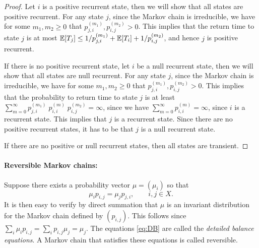 \begin{proof}
Let $i$ is a positive recurrent state, then we will show that all
states are positive recurrent. For any state $j$, since the Markov
chain is irreducible, we have for some $m_1,m_2\geq 0$ that
$p^{(m_1)}_{j,i},p^{(m_2)}_{i,j}>0$. This implies that the return
time to state $j$ is at most $\mathbb{E}[T_j]\leq
1/p^{(m_1)}_{j,i}+\mathbb{E}[T_i]+1/p^{(m_2)}_{i,j}$, and hence $j$ is
positive recurrent.

If there is no positive recurrent state, let $i$ be a null recurrent
state, then we will show that all states are null recurrent. For any
state $j$, since the Markov chain is irreducible, we have for some
$m_1,m_2\geq 0$ that $p^{(m_1)}_{j,i},p^{(m_2)}_{i,j}>0$. This
implies that the probability to return time to state $j$ is at least
$\sum_{m=0}^\infty
p^{(m_1)}_{j,i}\;p^{(m)}_{i,i}\;p^{(m_2)}_{i,j}=\infty$, since we
have $\sum_{m=0}^\infty p^{(m)}_{i,i}=\infty$, since $i$ is a
recurrent state. This implies that $j$ is a recurrent state. Since
there are no positive recurrent states, it has to be that $j$ is a
null recurrent state.

If there are no positive or null recurrent states, then all states
are transient.
%
%
%
\end{proof}

\paragraph{Reversible Markov chains:} Suppose there exists a probability vector $\mu  = ({\mu_i})$ so that
\begin{equation}\label{eq:DB}
{\mu _i}{p_{i,j}} = {\mu _j}{p_{j,i}},\quad \quad i,j \in X.
\end{equation}
It is then easy to verify by direct summation that $\mu $ is an
invariant distribution for the Markov chain defined by
$({p_{i,j}})$. This follows since $\sum_i \mu_i p_{i,j}=\sum_i
p_{i,j}\mu_j=\mu_j$. The equations \eqref{eq:DB} are called the
\emph{detailed balance equations}. A Markov chain that satisfies
these equations is called reversible.

